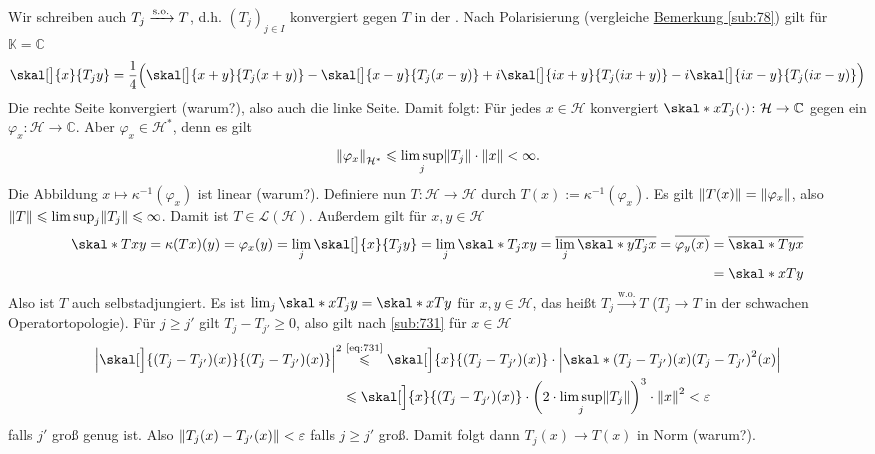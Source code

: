 \noindent Wir schreiben auch $T_j \xrightarrow{\mathrm{s.o.}} T$, d.h. $(T_j)_{j \in I}$ konvergiert gegen $T$ in der .
Nach Polarisierung (vergleiche \hyperref[sub:78]{Bemerkung \ref*{sub:78}}) gilt für $\mathds{K}=\mathds{C}$
\[
	\skal[\big]{x}{T_j y} = \frac{1}{4} \enbrace[\Big]{\skal[\big]{x+y}{T_j(x+y)} - \skal[\big]{x-y}{T_j(x-y)} + i \skal[\big]{i x +y}{T_j(ix +y)} 
	- i \skal[\big]{i x -y}{T_j(ix-y)}}
\]
Die rechte Seite konvergiert (warum?), also auch die linke Seite. Damit folgt: Für jedes $x \in \mathcal{H}$ konvergiert 
$\skal*{x}{T_j(\cdot)} \colon \mathcal{H} \to \mathds{C}$ gegen ein $\varphi_x \colon \mathcal{H} \to \mathds{C}$. Aber $\varphi_x \in \mathcal{H}^*$, denn es gilt
\begin{equation*}
	\norm[\mathcal{H}^*]{\varphi_x} \le \limsup_j \norm{T_j} \cdot \norm{x} < \infty. 
\end{equation*}
Die Abbildung $x \mapsto \kappa ^{-1}(\varphi_x)$ ist linear (warum?). Definiere nun
$T \colon \mathcal{H} \to \mathcal{H}$ durch $T(x) := \kappa ^{-1}(\varphi_x)$. Es gilt $\norm{T(x)} = \norm{\varphi_x}$, also $\norm{T}\le\limsup_j \norm{T_j} \le \infty$.
Damit ist $T \in \mathcal{L}(\mathcal{H})$. Außerdem gilt für $x,y \in \mathcal{H}$
\begin{align*}
	\skal*{T x}{y} = \kappa(T x)(y) = \varphi_x(y) = \lim_j \skal[\big]{x}{T_j y} = \lim_j \skal*{T_j x}{y} = \overline{\lim_j \skal*{y}{T_j x}} 
	= \overline{\varphi_y(x)} &= \overline{\skal*{T y}{x}}\\  &= \skal*{x}{T y}  
\end{align*}
Also ist $T$ auch selbstadjungiert. Es ist $\lim_j \skal*{x}{T_j y} = \skal*{x}{T y}$ für $x,y \in \mathcal{H}$, das heißt $T_j \xrightarrow{\mathrm{w.o.}} T$
($T_j \to T$ in der schwachen Operatortopologie). Für $j \ge j'$ gilt $T_j - T_{j'} \ge 0$, also gilt nach \ref{sub:731} für $x \in \mathcal{H}$
\begin{align*}
	\abs*{\skal[\Big]{\enbrace*{T_j - T_{j'}}(x)}{\enbrace*{T_j - T_{j'}}(x)}}^2 &\stackrel{\mbox{\scriptsize\eqref{eq:731}}}{\le} 
	\skal[\Big]{x}{\enbrace*{T_j - T_{j'}}(x) } \cdot \abs*{\skal*{\enbrace*{T_j - T_{j'}}(x)}{\enbrace*{T_j - T_{j'}}^2(x) }} \\
	&\le \skal[\Big]{x}{\enbrace*{T_j - T_{j'}}(x)} \cdot \enbrace*{2 \cdot \limsup_j \norm{T_j} }^3 \cdot \norm{x}^2 <  \varepsilon
\end{align*}
falls $j'$ groß genug ist. Also $\norm{T_j(x)- T_{j'}(x)}< \varepsilon$ falls $j \ge j'$ groß. Damit folgt dann $T_j(x) \to T(x)$ in Norm (warum?). \bewende
\newpage

